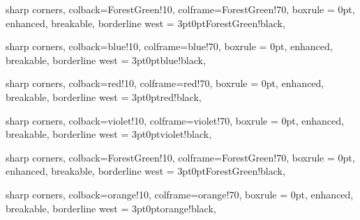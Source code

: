 \newcommand{\eu}{\mathrm{e}}

\newcommand{\im}{\mathrm{i}}

\newenvironment{sampans}{\noindent\textit{Solution.}}{\hfill$\square$}






{ 
    sharp corners,
    colback=ForestGreen!10,
    colframe=ForestGreen!70,
    boxrule = 0pt,
    enhanced,
    breakable,
    borderline west = {3pt}{0pt}{ForestGreen!black},
}

{ 
    sharp corners,
    colback=blue!10,
    colframe=blue!70,
    boxrule = 0pt,
    enhanced,
    breakable,
    borderline west = {3pt}{0pt}{blue!black},
}

{ 
    sharp corners,
    colback=red!10,
    colframe=red!70,
    boxrule = 0pt,
    enhanced,
    breakable,
    borderline west = {3pt}{0pt}{red!black},
}

{ 
    sharp corners,
    colback=violet!10,
    colframe=violet!70,
    boxrule = 0pt,
    enhanced,
    breakable,
    borderline west = {3pt}{0pt}{violet!black},
}

{ 
    sharp corners,
    colback=ForestGreen!10,
    colframe=ForestGreen!70,
    boxrule = 0pt,
    enhanced,
    breakable,
    borderline west = {3pt}{0pt}{ForestGreen!black},
}

{
  sharp corners,
    colback=orange!10,
    colframe=orange!70,
    boxrule = 0pt,
    enhanced,
    breakable,
    borderline west = {3pt}{0pt}{orange!black},
}
\newcommand{\emp}[2]{\textcolor{#2}{\textbf{#1}}}
